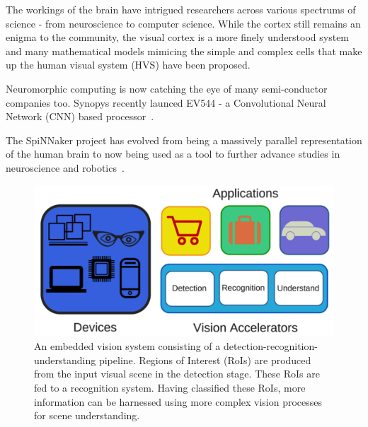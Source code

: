 The workings of the brain have intrigued researchers across various spectrums of science - from neuroscience to computer science. While the cortex still remains 
an enigma to the community, the visual cortex is a more finely understood system and many mathematical models mimicing the simple and complex cells that make up the 
human visual system (HVS) have been proposed.

Neuromorphic computing is now catching the eye of many semi-conductor companies too. Synopys recently launced 
EV544 - a Convolutional Neural Network (CNN) based processor~\cite{syncnn}.

The SpiNNaker project has evolved from being a massively parallel representation of the human brain to now being used as a tool to further advance studies in 
neuroscience and robotics~\cite{spinnaker}.

\begin{figure}[!htb]
\vspace{0pt}
\centering
\includegraphics[width=0.9\linewidth]{./figures/vision_apps_devices.png}
\vspace{0pt}
\caption{An embedded vision system consisting of a detection-recognition-understanding pipeline. Regions of Interest (RoIs) are produced from the input visual scene in the detection stage. These RoIs are fed to a recognition system. Having classified these RoIs, more information can be harnessed using more complex vision processes for scene understanding.}
\label{fig:iot}
\vspace{0pt}
\end{figure}

